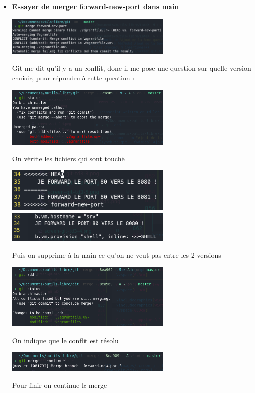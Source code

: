 \documentclass[12pt]{article}
\begin{document}
\begin{itemize}
  \item \textbf{Essayer de merger forward-new-port dans main}
  \vspace{0.3cm}

  \includegraphics[width=8cm]{images/screen-git-td3-4.png}
  \vspace{0.3cm}

  Git me dit qu'il y a un conflit, donc il me pose une question sur quelle version choisir, pour répondre à cette question :
  \vspace{0.3cm}

  \includegraphics[width=8cm]{images/screen-git-td3-5.png}
  \vspace{0.3cm}

  On vérifie les fichiers qui sont touché
  \vspace{0.3cm}

  \includegraphics[width=8cm]{images/screen-git-td3-6.png} \hfill
  \includegraphics[width=8cm]{images/screen-git-td3-7.png}
  \vspace{0.3cm}

  Puis on supprime à la main ce qu'on ne veut pas entre les 2 versions
  \vspace{0.3cm}

  \includegraphics[width=8cm]{images/screen-git-td3-8.png}
  \vspace{0.3cm}

  On indique que le conflit est résolu
  \vspace{0.3cm}

  \includegraphics[width=8cm]{images/screen-git-td3-9.png}
  \vspace{0.3cm}

  Pour finir on continue le merge
\end{itemize}
\end{document}
